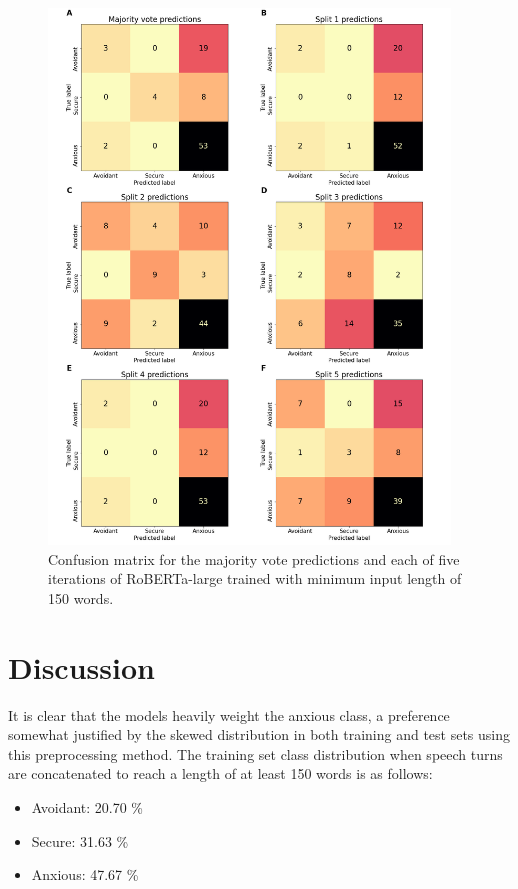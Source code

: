 \documentclass[12pt]{report}
\begin{document}
\begin{figure}
    \includegraphics[width=0.95\textwidth]{figures/combined_confusion_matrix.png}
    \caption{Confusion matrix for the majority vote predictions and each of five iterations of RoBERTa-large trained with minimum input length of 150 words.}
    \label{fig: all confusion matrices}
\end{figure}

\section{Discussion}
It is clear that the models heavily weight the anxious class, a preference somewhat justified by the skewed distribution in both training and test sets using this preprocessing method.
The training set class distribution when speech turns are concatenated to reach a length of at least 150 words is as follows:
\begin{itemize}
    \item Avoidant: 20.70 \%
    \item Secure: 31.63 \%
    \item Anxious: 47.67 \%
\end{itemize}
\end{document}
